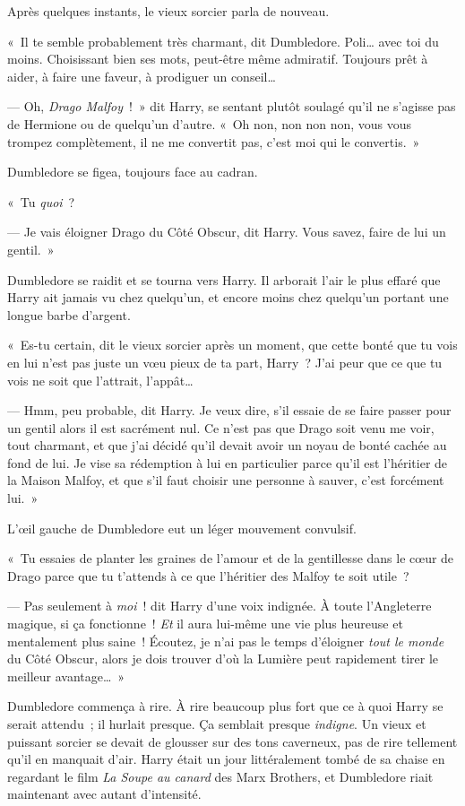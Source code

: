 Après quelques instants, le vieux sorcier parla de nouveau.

«~Il te semble probablement très charmant, dit Dumbledore.
Poli… avec toi du moins.
Choisissant bien ses mots, peut-être même admiratif.
Toujours prêt à aider, à faire une faveur, à prodiguer un conseil…

--- Oh, \emph{Drago Malfoy}~!~»
dit Harry, se sentant plutôt soulagé qu'il ne s'agisse pas de Hermione ou de quelqu'un d'autre.
«~Oh non, non non non, vous vous trompez complètement, il ne me convertit pas, c'est moi qui le convertis.~»

Dumbledore se figea, toujours face au cadran.

«~Tu \emph{quoi}~?

--- Je vais éloigner Drago du Côté Obscur, dit Harry.
Vous savez, faire de lui un gentil.~»

Dumbledore se raidit et se tourna vers Harry.
Il arborait l'air le plus effaré que Harry ait jamais vu chez quelqu'un, et encore moins chez quelqu'un portant une longue barbe d'argent.

«~Es-tu certain, dit le vieux sorcier après un moment, que cette bonté que tu vois en lui n'est pas juste un vœu pieux de ta part, Harry~?
J'ai peur que ce que tu vois ne soit que l'attrait, l'appât…

--- Hmm, peu probable, dit Harry.
Je veux dire, s'il essaie de se faire passer pour un gentil alors il est sacrément nul.
Ce n'est pas que Drago soit venu me voir, tout charmant, et que j'ai décidé qu'il devait avoir un noyau de bonté cachée au fond de lui.
Je vise sa rédemption à lui en particulier parce qu'il est l'héritier de la Maison Malfoy, et que s'il faut choisir une personne à sauver, c'est forcément lui.~»

L'œil gauche de Dumbledore eut un léger mouvement convulsif.

«~Tu essaies de planter les graines de l'amour et de la gentillesse dans le cœur de Drago parce que tu t'attends à ce que l'héritier des Malfoy te soit utile~?

--- Pas seulement à \emph{moi}~! dit Harry d'une voix indignée.
À toute l'Angleterre magique, si ça fonctionne~!
\emph{Et} il aura lui-même une vie plus heureuse et mentalement plus saine~!
Écoutez, je n'ai pas le temps d'éloigner \emph{tout le monde} du Côté Obscur, alors je dois trouver d'où la Lumière peut rapidement tirer le meilleur avantage…~»

Dumbledore commença à rire.
À rire beaucoup plus fort que ce à quoi Harry se serait attendu~; il hurlait presque.
Ça semblait presque \emph{indigne}.
Un vieux et puissant sorcier se devait de glousser sur des tons caverneux, pas de rire tellement qu'il en manquait d'air.
Harry était un jour littéralement tombé de sa chaise en regardant le film \emph{La Soupe au canard} des Marx Brothers, et Dumbledore riait maintenant avec autant d'intensité.

